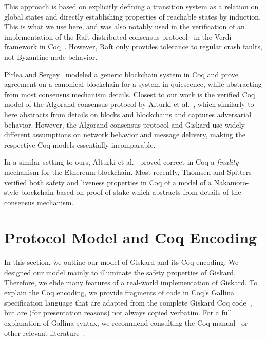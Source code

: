 \documentclass{easychair}
\begin{document}
 This approach is based on explicitly defining a transition system as a relation on global states and directly establishing properties of reachable states by induction. This is what we use here, and was also notably used in the verification of an implementation of the Raft distributed consensus protocol~\cite{Woos2016} in the Verdi framework in Coq~\cite{Wilcox2015}. However, Raft only provides tolerance to regular crash faults, not Byzantine node behavior. 

P{\^{\i}}rlea and Sergey~\cite{Pirlea2018} modeled a generic blockchain system in Coq and prove agreement on a canonical blockchain for a system in quiescence, while abstracting from most consensus mechanism details. Closest to our work is the verified Coq model of the Algorand consensus protocol by Alturki et al.~\cite{Alturki2020}, which similarly to here abstracts from details on blocks and blockchains and captures adversarial behavior. However, the Algorand consensus protocol and Giskard use widely different assumptions on network behavior and message delivery, making the respective Coq models essentially incomparable.

In a similar setting to ours, Alturki et al.~\cite{Gasper} proved correct in Coq a \emph{finality} mechanism for the Ethereum blockchain. Most recently, Thomsen and Spitters~\cite{Thomsen2020} verified both safety and liveness properties in Coq of a model of a Nakamoto-style blockchain based on proof-of-stake which abstracts from details of the consensus mechanism.

\section{Protocol Model and Coq Encoding}
\label{sec:encoding}
In this section, we outline our model of Giskard and its Coq encoding. We designed our model mainly to illuminate the safety properties of Giskard. Therefore, we elide many features of a real-world implementation of Giskard. To explain the Coq encoding, we provide fragments of code in Coq's Gallina specification language that are adapted from the complete Giskard Coq code~\cite{CoqGiskard}, but are (for presentation reasons) not always copied verbatim. For a full explanation of Gallina syntax, we recommend consulting the Coq manual~\cite{Gallina812} or other relevant literature~\cite{CoqArt}.
\end{document}
